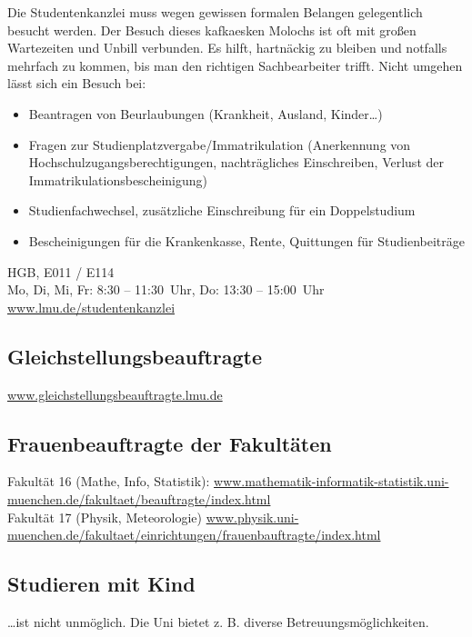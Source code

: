 \documentclass[twoside,12pt,parskip=half-]{scrartcl}
\begin{document}
Die Studentenkanzlei muss wegen gewissen formalen Belangen
gelegentlich besucht werden. Der Besuch dieses kafkaesken Molochs ist
oft mit großen Wartezeiten und Unbill verbunden.  Es hilft, hartnäckig
zu bleiben und notfalls mehrfach zu kommen, bis man den richtigen
Sachbearbeiter trifft. Nicht umgehen lässt sich ein Besuch bei:

\begin{itemize}
\item Beantragen von Beurlaubungen (Krankheit, Ausland, Kinder\ldots)
\item Fragen zur Studienplatzvergabe/Immatrikulation (Anerkennung von Hochschulzugangsberechtigungen, nachträgliches Einschreiben, Verlust der Immatrikulationsbescheinigung)
\item Studienfachwechsel, zusätzliche Einschreibung für ein Doppelstudium
\item Bescheinigungen für die Krankenkasse, Rente, Quittungen für Studienbeiträge
\end{itemize}

HGB, E011 / E114\\
Mo, Di, Mi, Fr: 8:30 -- 11:30~Uhr, Do: 13:30 -- 15:00~Uhr\\
\url{www.lmu.de/studentenkanzlei}


\subsection{Gleichstellungsbeauftragte}

\url{www.gleichstellungsbeauftragte.lmu.de}

\subsection{Frauenbeauftragte der Fakultäten}

Fakultät 16 (Mathe, Info, Statistik): \newline
\url{www.mathematik-informatik-statistik.uni-muenchen.de/fakultaet/beauftragte/index.html}\\

Fakultät 17 (Physik, Meteorologie)\newline
\url{www.physik.uni-muenchen.de/fakultaet/einrichtungen/frauenbauftragte/index.html}

\subsection{Studieren mit Kind}

\ldots ist nicht unmöglich. Die Uni bietet z. B. diverse Betreuungsmöglichkeiten.
\end{document}
